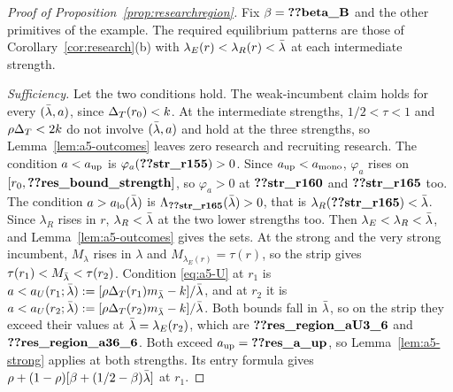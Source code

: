 \begin{proof}[Proof of Proposition~\ref{prop:researchregion}]
Fix \(\beta=\reg{beta_B}\) and the other primitives of the example. The required equilibrium patterns are those of Corollary~\ref{cor:research}(b)
with \(\lambda_E(r)<\lambda_R(r)<\bar\lambda\) at each intermediate strength.

\emph{Sufficiency.} Let the two conditions hold. The weak-incumbent claim holds for every \((\bar\lambda,a)\), since
\(\Delta_T(r_0)<k\). At the intermediate strengths, \(1/2<\tau<1\) and \(\rho\Delta_T<2k\) do not involve \((\bar\lambda,a)\) and hold
at the three strengths, so Lemma~\ref{lem:a5-outcomes} leaves zero research and recruiting research.
The condition \(a<a_{\rm up}\) is \(\varphi_a(\reg{str_r155})>0\). Since
\(a_{\rm up}<a_{\rm mono}\), \(\varphi_a\) rises on \([r_0,\reg{res_bound_strength}]\), so \(\varphi_a>0\) at \(\reg{str_r160}\) and
\(\reg{str_r165}\) too. The condition \(a>a_{\rm lo}(\bar\lambda)\) is \(\Lambda_{\reg{str_r165}}(\lb)>0\), that is
\(\lambda_R(\reg{str_r165})<\lb\). Since \(\lambda_R\) rises in \(r\), \(\lambda_R<\bar\lambda\) at the two lower strengths
too. Then \(\lambda_E<\lambda_R<\bar\lambda\), and Lemma~\ref{lem:a5-outcomes} gives the sets. At the strong and the very strong incumbent, \(M_\lambda\) rises
in \(\lambda\) and \(M_{\lambda_E(r)}=\tau(r)\), so the strip gives \(\tau(r_1)<M_{\bar\lambda}<\tau(r_2)\). Condition
\eqref{eq:a5-U} at \(r_1\) is \(a<a_{U}(r_1;\bar\lambda):=[\rho\Delta_T(r_1)m_{\bar\lambda}-k]/\bar\lambda\), and at \(r_2\) it is
\(a<a_{U}(r_2;\bar\lambda):=[\rho\Delta_T(r_2)m_{\bar\lambda}-k]/\bar\lambda\). Both bounds fall in \(\bar\lambda\), so on the strip they exceed their
values at \(\bar\lambda=\lambda_E(r_2)\), which are \(\reg{res_region_aU3_6}\) and \(\reg{res_region_a36_6}\). Both exceed
\(a_{\rm up}=\reg{res_a_up}\), so Lemma~\ref{lem:a5-strong} applies at both strengths.
Its entry formula gives \(\rho+(1-\rho)[\beta+(1/2-\beta)\bar\lambda]\) at \(r_1\).


\end{proof}
